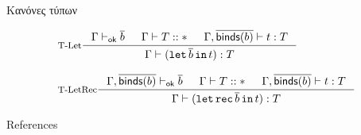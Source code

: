 \documentclass[10pt]{beamer}
\begin{document}
\begin{frame}{Κανόνες τύπων}

  \begin{minipage}[t]{10cm}
    \centering
    \begin{displaymath}
    \begin{array}{ll}

    \multicolumn{2}{l}{\inference[T-Let]{
    \Gamma \provesok \seq{b} &
    \Gamma |- T :: \Type &
    \Gamma, \seq{\binds{b}} |- t : T
    }
    { \Gamma |- (\tlet \seq{b} \tin t) : T
    }}\\
    \\
    \multicolumn{2}{l}{\inference[T-LetRec]{
    \Gamma, \seq{\binds{b}} \provesok \seq{b} &
    \Gamma |- T :: \Type &
    \Gamma, \seq{\binds{b}} |- t : T
    }
    { \Gamma |- (\tlet \rec \seq{b} \tin t) : T
    }}
    \end{array}
    \end{displaymath}
    \end{minipage}

\end{frame}


\begin{frame}[allowframebreaks]{References}


\end{frame}
\end{document}
